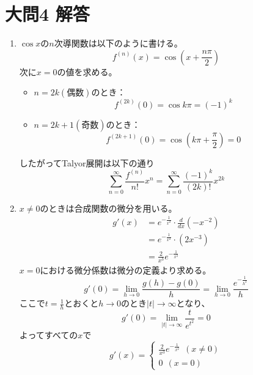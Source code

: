 \documentclass[dvipdfmx]{jsreport}
\begin{document}
\section{大問4 解答}
\begin{souanswer} %
\begin{enumerate}
	\item $\cos{x}$の$n$次導関数は以下のように書ける。
\begin{equation*}
	f^{(n)}(x)= \cos{\left(x+ \frac{n\pi}{2}\right)}
\end{equation*}
	次に$x= 0$の値を求める。
\begin{itemize}
	\item $n= 2k(偶数)$のとき：
\begin{equation*}
	f^{(2k)}(0)= \cos{k\pi}= (-1)^k
\end{equation*}
	\item $n= 2k+ 1(奇数)$のとき：
\begin{equation*}
	f^{(2k+ 1)}(0)= \cos{\left(k\pi+ \frac{\pi}{2}\right)}= 0
\end{equation*}
\end{itemize}
	したがってTalyor展開は以下の通り
\begin{equation*}
	\sum_{n= 0}^\infty \frac{f^{(n)}}{n!}x^n= \sum_{n= 0}^\infty \frac{(-1)^k}{(2k)!}x^{2k}
\end{equation*}
	\item $x\ne 0$のときは合成関数の微分を用いる。
\begin{align*}
	g'(x)
	&= e^{-\frac{1}{x^2}}\cdot \frac{d}{dx}(-x^{-2})\\
	&= e^{-\frac{1}{x^2}}\cdot (2x^{-3})\\
	&= \frac{2}{x^3}e^{-\frac{1}{x^2}}
\end{align*}
	$x= 0$における微分係数は微分の定義より求める。
\begin{equation*}
	g'(0)= \lim_{h\to 0}\frac{g(h)- g(0)}{h}= \lim_{h\to 0} \frac{e^{-\frac{1}{h^2}}}{h}
\end{equation*}
	ここで$t= \frac{1}{h}$とおくと$h\to 0$のとき$|t|\to \infty$となり、
\begin{equation*}
	g'(0)= \lim_{|t|\to \infty} \frac{t}{e^{t^2}}= 0
\end{equation*}
	よってすべての$x$で
\begin{equation*}
	g'(x)= 
\begin{cases}
	\frac{2}{x^3}e^{-\frac{1}{x^2}}\ \ (x\ne 0)\\
0\ \ (x= 0)
\end{cases}
\end{equation*}

\end{enumerate}
\end{souanswer}
\end{document}
